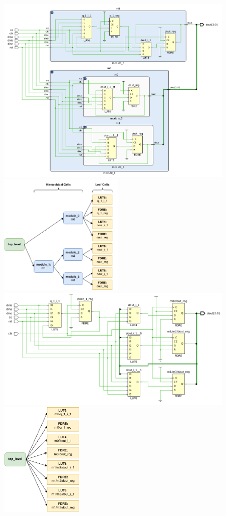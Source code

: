 {
    \centering
    \includegraphics[valign=c, width=11.5cm]{figures/netlist_synth/hier_netlist.png}
    \includegraphics[valign=c, width=6cm]{figures/netlist_synth/hier_graph.png}
    \label{fig:hier_netlist}
}
\vspace{0.5cm}
{
    \centering
    \includegraphics[valign=c, width=11.5cm]{figures/netlist_synth/flat_netlist.png}
    \includegraphics[valign=c, width=4cm]{figures/netlist_synth/flat_graph.png}
    \label{fig:flat_netlist}
}
